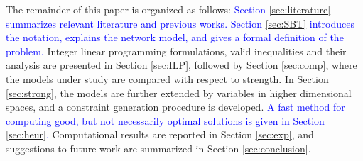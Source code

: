 The remainder of this paper is organized as follows: 
\textcolor{blue}{Section \ref{sec:literature} summarizes relevant literature and previous works.}
\textcolor{blue}{Section \ref{sec:SBT} introduces the notation, explains the network model, and gives a formal definition of the problem.}
Integer linear programming formulations, valid inequalities and their analysis are presented in Section \ref{sec:ILP},
followed by Section \ref{sec:comp}, where the models under study are compared with respect to strength.
In Section \ref{sec:strong}, the models are further extended by variables in higher dimensional spaces,
and a constraint generation procedure is developed.
\textcolor{blue}{A fast method for computing good, but not necessarily optimal solutions is given in Section \ref{sec:heur}.}
Computational results are reported in Section \ref{sec:exp},
and suggestions to future work are summarized in Section \ref{sec:conclusion}.
